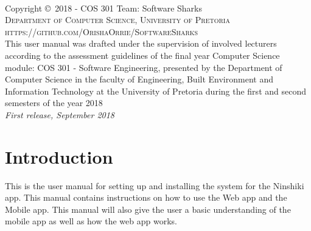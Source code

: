\documentclass[a4paper, 12pt]{article}
\begin{document}
\pagebreak


\newpage
~\vfill
\thispagestyle{empty}

\noindent Copyright \copyright\ 2018 - COS 301 Team: Software Sharks\\ %

\noindent \textsc{Department of Computer Science, University of Pretoria}\\

\noindent \textsc{https://github.com/OrishaOrrie/SoftwareSharks}\\ %

\noindent This user manual was drafted under the supervision of involved lecturers according to the assessment guidelines of the final year Computer Science module: COS 301 - Software Engineering, presented by the Department of Computer Science in the faculty of Engineering, Built Environment and Information Technology at the University of Pretoria during the first and second semesters of the year 2018 \\ %

\noindent \textit{First release, September 2018} %

\pagebreak

\tableofcontents

\pagebreak

\section{Introduction}
This is the user manual for setting up and installing the system for the Ninshiki app. This manual contains instructions on how to use the Web app and the Mobile app. This manual will also give the user a basic understanding of the mobile app as well as how the web app works.
\end{document}
